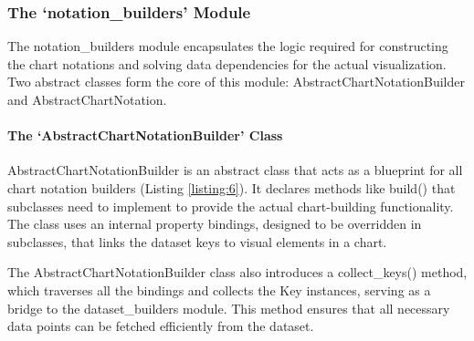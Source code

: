  \subsubsection{The `notation\_builders'
Module}\label{the-notation_builders-module}

The notation\_builders module encapsulates the logic required for
constructing the chart notations and solving data dependencies for the
actual visualization. Two abstract classes form the core of this module:
AbstractChartNotationBuilder and AbstractChartNotation.

\paragraph{The `AbstractChartNotationBuilder'
Class}\label{the-abstractchartnotationbuilder-class}

AbstractChartNotationBuilder is an abstract class that acts as a
blueprint for all chart notation builders (Listing \ref{listing:6}). It declares
methods like build() that subclasses need to implement to
provide the actual chart-building functionality. The class uses an
internal property bindings, designed to be overridden in subclasses,
that links the dataset keys to visual elements in a chart.

The AbstractChartNotationBuilder class also introduces a collect\_keys()
method, which traverses all the bindings and collects the Key instances,
serving as a bridge to the dataset\_builders module. This method ensures
that all necessary data points can be fetched efficiently from the
dataset.


